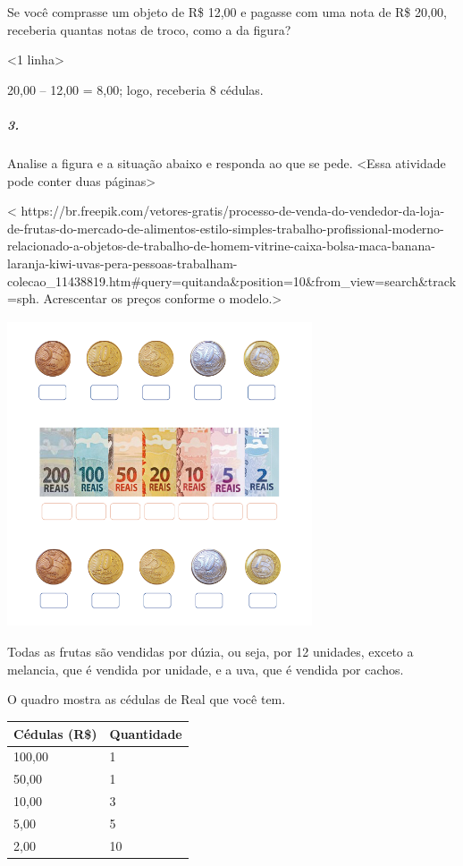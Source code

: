 Se você comprasse um objeto de R\$ 12,00 e pagasse com uma nota de R\$
20,00, receberia quantas notas de troco, como a da figura?

\textless{}1 linha\textgreater{}

20,00 -- 12,00 = 8,00; logo, receberia 8 cédulas.

\subparagraph{3.}\label{section-59}

Analise a figura e a situação abaixo e responda ao que se pede.
\textless{}Essa atividade pode conter duas páginas\textgreater{}

\textless{}
https://br.freepik.com/vetores-gratis/processo-de-venda-do-vendedor-da-loja-de-frutas-do-mercado-de-alimentos-estilo-simples-trabalho-profissional-moderno-relacionado-a-objetos-de-trabalho-de-homem-vitrine-caixa-bolsa-maca-banana-laranja-kiwi-uvas-pera-pessoas-trabalham-colecao\_11438819.htm\#query=quitanda\&position=10\&from\_view=search\&track=sph.
Acrescentar os preços conforme o modelo.\textgreater{}

\includegraphics[width=3.55208in,height=3.57292in]{media/image71.png}

Todas as frutas são vendidas por dúzia, ou seja, por 12 unidades, exceto
a melancia, que é vendida por unidade, e a uva, que é vendida por cachos.

O quadro mostra as cédulas de Real que você tem.

\begin{longtable}[]{@{}ll@{}}
\toprule
Cédulas (R\$) & Quantidade\tabularnewline
\midrule
\endhead
100,00 & 1\tabularnewline
50,00 & 1\tabularnewline
10,00 & 3\tabularnewline
5,00 & 5\tabularnewline
2,00 & 10\tabularnewline
\bottomrule
\end{longtable}

